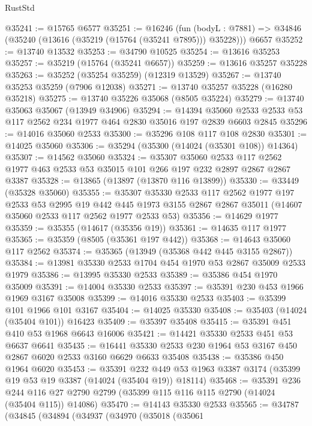 \begin{lexlean}{RustStd}
\begin{coremodule}
@35241 := @15765 @6577
@35251 := @16246
    (fun (bodyL : @7881) => @34846 (@35240 (@13616 (@35219 (@15764 (@35241 @7895))) @35228)))
    @6657
@35252 := @13740 @13532
@35253 := @34790 @10525
@35254 := @13616 @35253
@35257 := @35219 (@15764 (@35241 @6657))
@35259 := @13616 @35257 @35228
@35263 := @35252 (@35254 @35259) (@12319 @13529)
@35267 := @13740 @35253 @35259 (@7906 @12038)
@35271 := @13740 @35257 @35228 (@16280 @35218)
@35275 := @13740 @35226 @35068 (@8505 @35224)
@35279 := @13740 @35063 @35067 (@13949 @34906)
@35294 := @14394
    @35060
    @2533
    @2533
    @53
    @117
    @2562
    @234
    @1977
    @464
    @2830
    @35016
    @197
    @2839
    @6603
    @2845
@35296 := @14016 @35060 @2533
@35300 := @35296 @108 @117 @108 @2830
@35301 := @14025 @35060
@35306 := @35294 (@35300 (@14024 (@35301 @108)) @14364)
@35307 := @14562 @35060
@35324 := @35307
    @35060
    @2533
    @117
    @2562
    @1977
    @463
    @2533
    @53
    @35015
    @101
    @266
    @197
    @232
    @2897
    @2867
    @2867
    @3387
@35328 := @13865 (@13897 (@13870 @116 @13899))
@35330 := @33449 (@35328 @35060)
@35355 := @35307
    @35330
    @2533
    @117
    @2562
    @1977
    @197
    @2533
    @53
    @2995
    @19
    @442
    @445
    @1973
    @3155
    @2867
    @2867
    @35011
    (@14607 @35060 @2533 @117 @2562 @1977 @2533 @53)
@35356 := @14629 @1977
@35359 := @35355 (@14617 (@35356 @19))
@35361 := @14635 @117 @1977
@35365 := @35359 (@8505 (@35361 @197 @442))
@35368 := @14643 @35060 @117 @2562
@35374 := @35365 (@13949 (@35368 @442 @445 @3155 @2867))
@35384 := @13981 @35330 @2533 @1704 @454 @1970 @53 @2867 @35009 @2533 @1979
@35386 := @13995 @35330 @2533
@35389 := @35386 @454 @1970 @35009
@35391 := @14004 @35330 @2533
@35397 := @35391 @230 @453 @1966 @1969 @3167 @35008
@35399 := @14016 @35330 @2533
@35403 := @35399 @101 @1966 @101 @3167
@35404 := @14025 @35330
@35408 := @35403 (@14024 (@35404 @101)) @16423
@35409 := @35397 @35408
@35415 := @35391 @451 @410 @53 @1968 @6643 @16006
@35421 := @14421 @35330 @2533 @451 @53 @6637 @6641
@35435 := @16441 @35330 @2533 @230 @1964 @53 @3167 @450 @2867 @6020 @2533 @3160 @6629 @6633 @35408
@35438 := @35386 @450 @1964 @6020
@35453 := @35391
    @232
    @449
    @53
    @1963
    @3387
    @3174
    (@35399 @19 @53 @19 @3387 (@14024 (@35404 @19)) @18114)
@35468 := @35391
    @236
    @244
    @116
    @27
    @2790
    @2799
    (@35399 @115 @116 @115 @2790 (@14024 (@35404 @115)) @14086)
@35470 := @14143 @35330 @2533
@35565 := @34787
    (@34845
      (@34894
        (@34937
          (@34970
            (@35018
              (@35061

\end{coremodule}
\end{lexlean}
